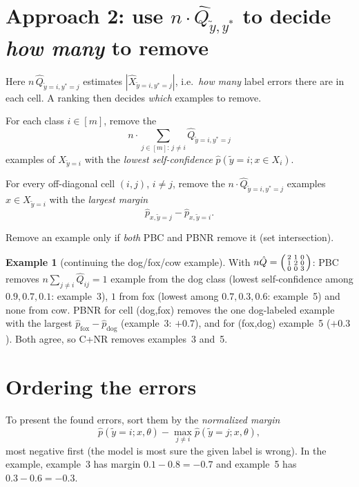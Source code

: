 \documentclass[11pt,a4paper]{report}
\newcommand{\1}{\mathbf 1}
\theoremstyle{definition}
\newtheorem{example}[definition]{Example}
\theoremstyle{plain}
\theoremstyle{remark}
\begin{document}
\section{Approach 2: use $n\cdot\hat Q_{\tilde y,y^*}$ to decide \emph{how many} to remove}
Here $n\,\hat Q_{\tilde y=i,y^*=j}$ estimates $|\hat X_{\tilde y=i,y^*=j}|$, i.e.\ \emph{how many} label errors there are in each cell. A ranking then decides \emph{which} examples to remove.
\begin{description}[leftmargin=1.5cm,style=nextline]
\item[Method 3: Prune by Class (PBC).] For each class $i\in[m]$, remove the
\[
n\cdot\sum_{j\in[m]:\,j\ne i}\hat Q_{\tilde y=i,y^*=j}
\]
examples of $X_{\tilde y=i}$ with the \emph{lowest self-confidence} $\hat p(\tilde y=i;x\in X_i)$.
\item[Method 4: Prune by Noise Rate (PBNR).] For every off-diagonal cell $(i,j)$, $i\ne j$, remove the $n\cdot\hat Q_{\tilde y=i,y^*=j}$ examples $x\in X_{\tilde y=i}$ with the \emph{largest margin}
\[
\hat p_{x,\tilde y=j}-\hat p_{x,\tilde y=i}.
\]
\item[Method 5: C+NR.] Remove an example only if \emph{both} PBC and PBNR remove it (set intersection).
\end{description}

\begin{example}[continuing the dog/fox/cow example]
With $n\hat Q=\begin{psmallmatrix}2&1&0\\1&2&0\\0&0&3\end{psmallmatrix}$: PBC removes $n\sum_{j\ne i}\hat Q_{ij}=1$ example from the dog class (lowest self-confidence among $0.9,0.7,0.1$: example~3), $1$ from fox (lowest among $0.7,0.3,0.6$: example~5) and none from cow. PBNR for cell (dog,fox) removes the one dog-labeled example with the largest $\hat p_{\text{fox}}-\hat p_{\text{dog}}$ (example~3: $+0.7$), and for (fox,dog) example~5 ($+0.3$). Both agree, so C+NR removes examples~3 and~5.
\end{example}

\section{Ordering the errors}
To present the found errors, sort them by the \emph{normalized margin}
\[
\hat p(\tilde y=i;x,\theta)-\max_{j\ne i}\hat p(\tilde y=j;x,\theta),
\]
most negative first (the model is most sure the given label is wrong). In the example, example~3 has margin $0.1-0.8=-0.7$ and example~5 has $0.3-0.6=-0.3$.
\end{document}
